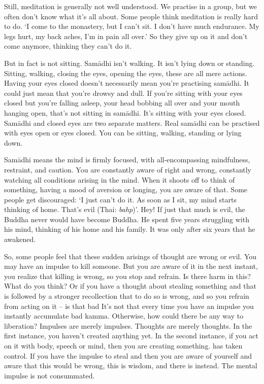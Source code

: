 Still, meditation is generally not well understood. We practise in a group, but we often don't know what it's all about. Some people think meditation is really hard to do. `I come to the monastery, but I can't sit. I don't have much endurance. My legs hurt, my back aches, I'm in pain all over.' So they give up on it and don't come anymore, thinking they can't do it. 

But in fact  is not sitting. Sam\=adhi isn't walking. It isn't lying down or standing. Sitting, walking, closing the eyes, opening the eyes, these are all mere actions. Having your eyes closed doesn't necessarily mean you're practising sam\=adhi. It could just mean that you're drowsy and dull. If you're sitting with your eyes closed but you're falling asleep, your head bobbing all over and your mouth hanging open, that's not sitting in sam\=adhi. It's sitting with your eyes closed. Sam\=adhi and closed eyes are two separate matters. Real sam\=adhi can be practised with eyes open or eyes closed. You can be sitting, walking, standing or lying down. 

Sam\=adhi means the mind is firmly focused, with all-encompassing mindfulness, restraint, and caution. You are constantly aware of right and wrong, constantly watching all conditions arising in the mind. When it shoots off to think of something, having a mood of aversion or longing, you are aware of that. Some people get discouraged: `I just can't do it. As soon as I sit, my mind starts thinking of home. That's evil (Thai: \textit{bahp})'. Hey! If just that much is evil, the Buddha never would have become Buddha. He spent five years struggling with his mind, thinking of his home and his family. It was only after six years that he awakened. 

So, some people feel that these sudden arisings of thought are wrong or evil. You may have an impulse to kill someone. But you are aware of it in the next instant, you realize that killing is wrong, so you stop and refrain. Is there harm in this? What do you think? Or if you have a thought about stealing something and that is followed by a stronger recollection that to do so is wrong, and so you refrain from acting on it -- is that bad  It's not that every time you have an impulse you instantly accumulate bad kamma. Otherwise, how could there be any way to liberation? Impulses are merely impulses. Thoughts are merely thoughts. In the first instance, you haven't created anything yet. In the second instance, if you act on it with body, speech or mind, then you are creating something.  has taken control. If you have the impulse to steal and then you are aware of yourself and aware that this would be wrong, this is wisdom, and there is  instead. The mental impulse is not consummated.

